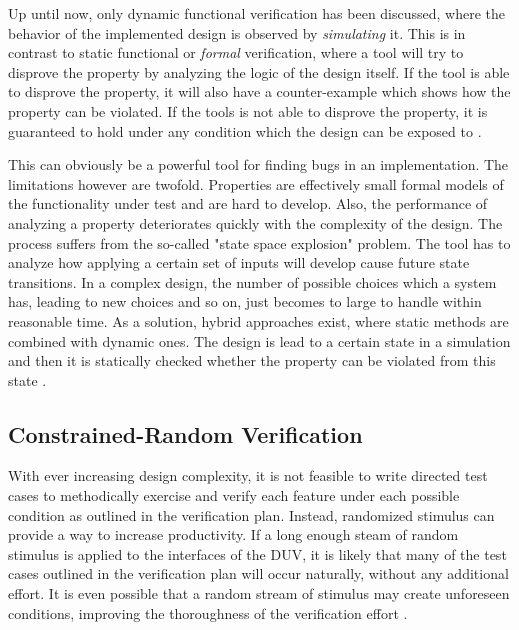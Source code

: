 Up until now, only dynamic functional verification has been discussed, where the behavior of the implemented design
is observed by \textit{simulating} it. This is in contrast to static functional or \textit{formal} verification,
where a tool will try to disprove the property by analyzing the logic of the design itself. If the tool is able to
disprove the property, it will also have a counter-example which shows how the property can be violated. If the tools
is not able to disprove the property, it is guaranteed to hold under any condition which the design can be exposed to
\cite[Ch. 14]{mehta2021introduction}.

This can obviously be a powerful tool for finding bugs in an implementation. The limitations however are twofold.
Properties are effectively small formal models of the functionality under test and are hard to develop. Also, the
performance of analyzing a property deteriorates quickly with the complexity of the design. The process suffers from
the so-called "state space explosion" problem. The tool has to analyze how applying a certain set of inputs will
develop cause future state transitions. In a complex design, the number of possible choices which a system has,
leading to new choices and so on, just becomes to large to handle within reasonable time. As a solution, hybrid
approaches exist, where static methods are combined with dynamic ones. The design is lead to a certain state in a
simulation and then it is statically checked whether the property can be violated from this state \cite[Ch.
14]{mehta2021introduction}.

\subsection{Constrained-Random Verification} %

With ever increasing design complexity, it is not feasible to write directed test cases to methodically exercise and
verify each feature under each possible condition as outlined in the verification plan. Instead, randomized stimulus
can provide a way to increase productivity. If a long enough steam of random stimulus is applied to the interfaces of
the DUV, it is likely that many of the test cases outlined in the verification plan will occur naturally, without any
additional effort. It is even possible that a random stream of stimulus may create unforeseen conditions, improving
the thoroughness of the verification effort \cite[Ch. 1]{bergeron2005verification}.

